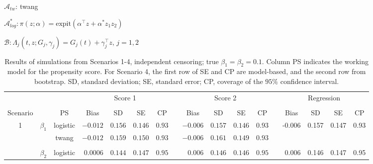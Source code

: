 \documentclass[11pt]{article}
\newcommand{\expit}{\text{expit}}
\begin{document}
\begin{table} [h]
\hskip 1in  $\mathcal{A}_{tw}$: twang 

\hskip 1in $\mathcal{A}^{*}_{log}: %
\pi(z ; \alpha)=\expit(\alpha^\top z + \alpha^{*}z_1z_2)$ 

\hskip 1in  $\mathcal{B}: %
 \Lambda_j(t, z; G_j, \gamma_j)=G_j(t) + \gamma_j^\top z$, $j=1, 2$
\end{table}




\begin{table}[h]
\footnotesize
\caption{Results of simulations from Scenarios 1-4, independent censoring; true $\beta_1= \beta_2 =0.1$. 
Column PS indicates the working model for the propensity score.
For Scenario 4, the first row of SE and CP
 are model-based, and the second row from bootstrap. SD, standard deviation; SE, standard error; CP, coverage of the $95\%$ confidence interval.}\label{res1}
\begin{center}
\setlength{\tabcolsep}{4.5pt}
\begin{tabular}{cccrccccrccccrccc}
\hline\hline
\multicolumn{2}{l}{} && \multicolumn{4}{c}{Score 1} &&  \multicolumn{4}{c}{Score 2} & &  \multicolumn{4}{c}{Regression}\tabularnewline %
\cline{4-7}\cline{9-12}\cline{14-17}
\\[-1.5ex] 
Scenario && PS &\multicolumn{1}{c}{Bias}&\multicolumn{1}{c}{SD}&\multicolumn{1}{c}{SE}&\multicolumn{1}{c}{CP}&&\multicolumn{1}{c}{Bias}&\multicolumn{1}{c}{SD}&\multicolumn{1}{c}{SE}&\multicolumn{1}{c}{CP} & &\multicolumn{1}{c}{Bias}&\multicolumn{1}{c}{SD}&\multicolumn{1}{c}{SE}&\multicolumn{1}{c}{CP}

\tabularnewline \hline\hline
\multirow{4}{*}{1}&\multirow{2}{*}{$\beta_1$}& logistic 
& $-0.012$&$0.156$&$0.146$&$0.93$&&$-0.006$&$0.157$&$0.146$&$0.93$
& \multirow{2}{*}{} & \multirow{2}{*}{-0.006} & \multirow{2}{*}{0.157} &  \multirow{2}{*}{0.147} & \multirow{2}{*}{0.93}\tabularnewline

& & twang 
&$-0.012$&$0.159$&$0.150$&$0.93$&&$-0.006$&$0.161$&$0.149$&$0.93$
&&&&& \tabularnewline
 \\[-1.5ex] 

&\multirow{2}{*}{$\beta_2$} & logistic 
&$0.0006$&$0.144$&$0.147$&$0.95$&&$0.006$&$0.146$&$0.146$&$0.95$ 
&\multirow{2}{*}{} & \multirow{2}{*}{0.006} & \multirow{2}{*}{0.146} & \multirow{2}{*}{0.147} & \multirow{2}{*}{0.95}\tabularnewline


\end{tabular}
\end{center}
\end{table}
\end{document}
